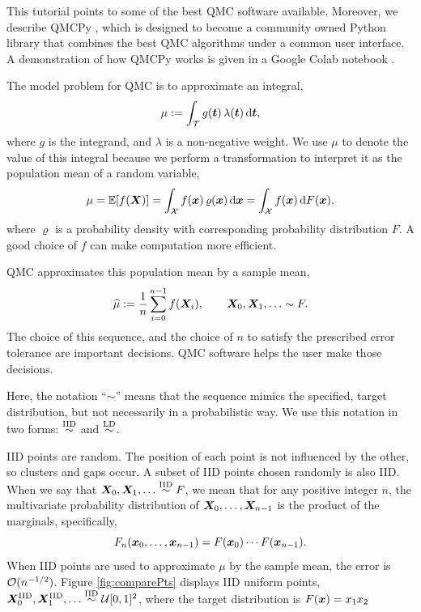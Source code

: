 \documentclass[graybox,footinfo]{svmult}
\newcommand{\hmu}{\widehat{\mu}}
\newcommand{\IID}{\textup{IID}}
\newcommand{\LD}{\textup{LD}}
\newcommand{\IIDsim}{\overset{\IID}{\sim}}
\newcommand{\LDsim}{\overset{\LD}{\sim}}
\begin{document}
This tutorial points to some of the best QMC software available.  Moreover, we describe QMCPy \cite{QMCPy2020a}, which is designed to become a community owned Python library that combines the best QMC algorithms under a common user interface.  A demonstration of how QMCPy works is given in a Google Colab notebook \cite{QMCPyTutColab2020}.

The model problem for QMC is to approximate an integral,
\begin{equation} \label{eq:integral}
	\mu := \int_\calT g(\bst) \, \lambda(\bst) \, \D \bst,
\end{equation}
where $g$ is the integrand, and $\lambda$ is a non-negative weight.  We use $\mu$ to denote the value of this integral because we perform a transformation to interpret it as the population mean of a random variable, 
\begin{equation} \label{eq:fintegral}
	\mu = \bbE[f(\bsX)] = \int_\calX f(\bsx) \, \varrho(\bsx) \, \D \bsx =  \int_\calX f(\bsx) \,  \D F(\bsx) ,
\end{equation}
where $\varrho$ is a probability density with corresponding probability distribution $F$. 
A good choice of $f$ can make computation more efficient.

QMC approximates this population mean by a sample mean,
\begin{equation} \label{eq:samplemean}
	\hmu := \frac 1n \sum_{i=0}^{n-1} f(\bsX_i), \qquad \bsX_0, \bsX_1, \ldots \sim F.
\end{equation}
The choice of this sequence, and the choice of $n$ to satisfy  the prescribed error tolerance are important decisions.  QMC software helps the user make those decisions.

Here, the notation ``$\sim$'' means that the sequence mimics the specified, target distribution, but not necessarily in a probabilistic way.  We  use this notation in two forms:  $\IIDsim$ and $\LDsim$.

IID points are random. The position of each point is not influenced by the other, so clusters and gaps occur.  A subset of IID points chosen randomly is also IID.  When we say that $\bsX_0, \bsX_1, \ldots \IIDsim F$, we mean that for any positive integer $n$, the  multivariate probability distribution of ${\boldsymbol{X}}_0, \ldots, {\boldsymbol{X}}_{n-1}$ is the product of the marginals, specifically,
\begin{equation*}
	F_{n}({\boldsymbol{x}}_0, \ldots, {\boldsymbol{x}}_{n-1}) = F({\boldsymbol{x}}_0) \cdots  F({\boldsymbol{x}}_{n-1}).
\end{equation*}
When IID points are used to approximate $\mu$ by the sample mean, the error is ${\mathcal{O}}(n^{-1/2})$.  Figure \ref{fig:comparePts} displays IID uniform points, $\bsX^{\IID}_0, \bsX^{\IID}_1, \ldots \IIDsim \calU[0,1]^2$, where the target distribution is $F({\boldsymbol{x}}) = x_1 x_2$
\end{document}
